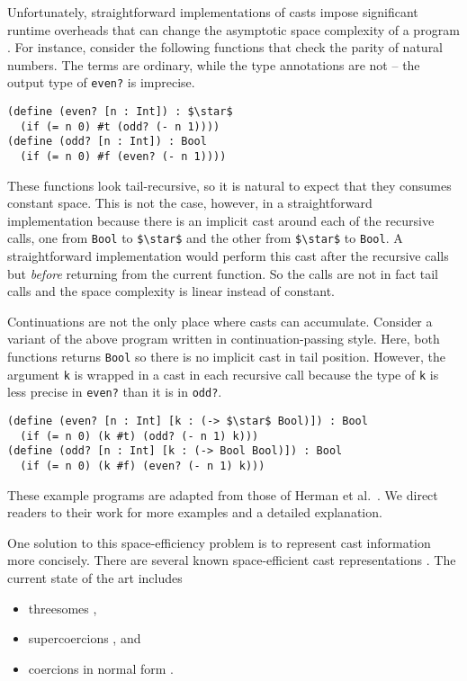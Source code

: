 \documentclass[runningheads]{llncs}
\begin{document}
Unfortunately, straightforward implementations of casts impose significant 
runtime overheads that can change the asymptotic space complexity of a program 
\citep{herman2010space}.
For instance, consider the following functions 
that check the parity of natural numbers. The terms are ordinary, while the 
type annotations are not -- the output type of \lstinline|even?| is 
imprecise.
\begin{lstlisting}
(define (even? [n : Int]) : $\star$
  (if (= n 0) #t (odd? (- n 1))))
(define (odd? [n : Int]) : Bool
  (if (= n 0) #f (even? (- n 1))))
\end{lstlisting}
These functions look tail-recursive, so it is natural to expect that
they consumes constant space. This is not the case, however, in a
straightforward implementation because there is an implicit cast
around each of the recursive calls, one from \lstinline|Bool| to
\lstinline|$\star$| and the other from \lstinline|$\star$| to
\lstinline|Bool|.  A straightforward implementation would perform this
cast after the recursive calls but \textit{before} returning from the
current function. So the calls are not in fact tail calls and the
space complexity is linear instead of constant.

Continuations are not the only place where casts can accumulate.
Consider a variant of the above program written in
continuation-passing style.  Here, both functions returns
\lstinline|Bool| so there is no implicit cast in tail position.
However, the argument \lstinline|k| is wrapped in a cast in each
recursive call because the type of \lstinline|k| is less precise in
\lstinline|even?| than it is in \lstinline|odd?|.
\begin{lstlisting}
(define (even? [n : Int] [k : (-> $\star$ Bool)]) : Bool
  (if (= n 0) (k #t) (odd? (- n 1) k)))
(define (odd? [n : Int] [k : (-> Bool Bool)]) : Bool
  (if (= n 0) (k #f) (even? (- n 1) k)))
\end{lstlisting}
These example programs are adapted from those of Herman et al.~\citep{herman2010space}.
We direct readers to their work for more examples and a detailed explanation.

One solution to this space-efficiency problem is to represent cast
information more concisely. There are several known space-efficient
cast representations
\citep{Siek:2015:BCT:2737924.2737968,Siek:2010:TWB:1706299.1706342,Garcia:2013:CTB:2500365.2500603,kuhlenschmidt2018efficient,siek2012interpretations,garcia2014deriving}.
The current state of the art includes
\begin{itemize}
	\item threesomes 
	\citep{Siek:2010:TWB:1706299.1706342,Garcia:2013:CTB:2500365.2500603},
	\item supercoercions \citep{Garcia:2013:CTB:2500365.2500603}, and
	\item coercions in normal form
	\citep{siek2012interpretations,Siek:2015:BCT:2737924.2737968}.
\end{itemize}
\end{document}
